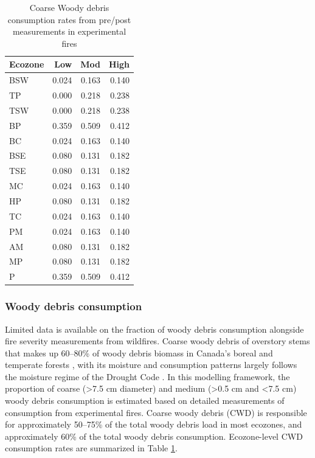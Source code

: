 \documentclass[, manuscript]{copernicus}
\begin{document}
\begin{table}
\centering
\caption{\label{tab:tab-CWDByEcozone}Coarse Woody debris consumption rates from pre/post measurements in experimental fires}
\centering
\begin{tabular}[t]{l|r|r|r}
\hline
Ecozone & Low & Mod & High\\
\hline
BSW & 0.024 & 0.163 & 0.140\\
\hline
TP & 0.000 & 0.218 & 0.238\\
\hline
TSW & 0.000 & 0.218 & 0.238\\
\hline
BP & 0.359 & 0.509 & 0.412\\
\hline
BC & 0.024 & 0.163 & 0.140\\
\hline
BSE & 0.080 & 0.131 & 0.182\\
\hline
TSE & 0.080 & 0.131 & 0.182\\
\hline
MC & 0.024 & 0.163 & 0.140\\
\hline
HP & 0.080 & 0.131 & 0.182\\
\hline
TC & 0.024 & 0.163 & 0.140\\
\hline
PM & 0.024 & 0.163 & 0.140\\
\hline
AM & 0.080 & 0.131 & 0.182\\
\hline
MP & 0.080 & 0.131 & 0.182\\
\hline
P & 0.359 & 0.509 & 0.412\\
\hline
\end{tabular}
\end{table}

\subsubsection{Woody debris consumption}

Limited data is available on the fraction of woody debris consumption
alongside fire severity measurements from wildfires. Coarse woody debris
of overstory stems that makes up 60--80\% of woody debris biomass in
Canada's boreal and temperate forests \citep{hanes2021}, with its
moisture and consumption patterns largely follows the moisture regime of
the Drought Code \citep{mcalpine1995}. In this modelling framework, the
proportion of coarse (\textgreater7.5 cm diameter) and medium
(\textgreater0.5 cm and \textless7.5 cm) woody debris consumption is
estimated based on detailed measurements of consumption from
experimental fires. Coarse woody debris (CWD) is responsible for
approximately 50--75\% of the total woody debris load in most ecozones,
and approximately 60\% of the total woody debris consumption.
Ecozone-level CWD consumption rates are summarized in Table
\ref{tab:tab-CWDByEcozone}.
\end{document}
